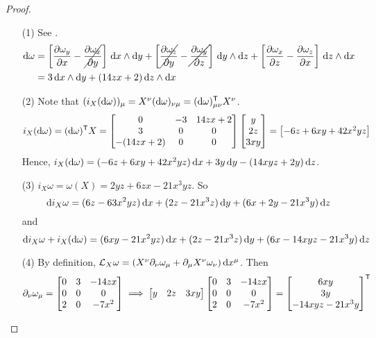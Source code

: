 \documentclass[a4paper, 10pt]{article}
\begin{document}
\begin{proof}
    \hphantom{.}
    \begin{itemize}
        \item[(1)] See .
        \begin{align*}
            \mathrm{d}\omega &= \left[\frac{\partial\omega_{y}}{\partial{x}} - \cancel{\frac{\partial\omega_{x}}{\partial{y}}}\right]\,\mathrm{d}{x}\wedge\mathrm{d}{y} + \left[\cancel{\frac{\partial\omega_{z}}{\partial{y}}} - \cancel{\frac{\partial\omega_{y}}{\partial{z}}}\right]\,\mathrm{d}{y}\wedge\mathrm{d}{z} + \left[\frac{\partial\omega_{x}}{\partial{z}} - \frac{\partial\omega_{z}}{\partial{x}}\right]\,\mathrm{d}{z}\wedge\mathrm{d}{x} \\
            &= 3 \, \mathrm{d}{x}\wedge\mathrm{d}{y} + (14zx + 2) \, \mathrm{d}{z}\wedge\mathrm{d}{x}
        \end{align*}
        \item[(2)] Note that $(i_{X}(\mathrm{d}\omega))_{\mu} = X^{\nu}(\mathrm{d}\omega)_{\nu\mu} = (\mathrm{d}\omega)^{\mathsf{T}}_{\mu\nu}X^{\nu}$.
        \[ i_{X}(\mathrm{d}\omega) = (\mathrm{d}\omega)^{\mathsf{T}}X = \begin{bmatrix}0 & -3 & 14zx + 2 \\ 3 & 0 & 0 \\ -(14zx + 2) & 0 & 0\end{bmatrix}\begin{bmatrix}y \\ 2z \\ 3xy\end{bmatrix} = \begin{bmatrix}-6z + 6xy + 42x^{2}yz\end{bmatrix} \]
        Hence, $i_{X}(\mathrm{d}\omega) = (-6z+6xy+42x^{2}yz)\,\mathrm{d}{x} + 3y\,\mathrm{d}{y} - (14xyz + 2y)\,\mathrm{d}{z}$.
        \item[(3)] $i_{X}\omega = \omega(X) = 2yz + 6zx - 21x^{3}yz$. So
        \[ \mathrm{d} i_{X}\omega = (6z-63x^{2}yz)\,\mathrm{d}{x} + (2z-21x^{3}z)\,\mathrm{d}{y} + (6x+2y-21x^{3}y)\,\mathrm{d}{z} \]
        and
        \[ \mathrm{d} i_{X}\omega + i_{X}(\mathrm{d}\omega) = (6xy-21x^{2}yz)\,\mathrm{d}{x} + (2z-21x^{3}z)\,\mathrm{d}{y} + (6x-14xyz-21x^{3}y)\,\mathrm{d}{z} \]
        \item[(4)] By definition, $\mathcal{L}_{X}\omega = (X^{\nu}\partial_{\nu}\omega_{\mu} + \partial_{\mu}X^{\nu}\omega_{\nu})\,\mathrm{d}{x}^{\mu}$. Then
        \[ \partial_{\nu}\omega_{\mu} = \begin{bmatrix}0 & 3 & -14zx \\ 0 & 0 & 0 \\ 2 & 0 & -7x^{2}\end{bmatrix} \;\Longrightarrow\; \begin{bmatrix}y & 2z & 3xy\end{bmatrix}\begin{bmatrix}0 & 3 & -14zx \\ 0 & 0 & 0 \\ 2 & 0 & -7x^{2}\end{bmatrix} = \begin{bmatrix}6xy \\ 3y \\ -14xyz-21x^{3}y\end{bmatrix}^{\mathsf{T}} \]

\end{itemize}
\end{proof}
\end{document}

